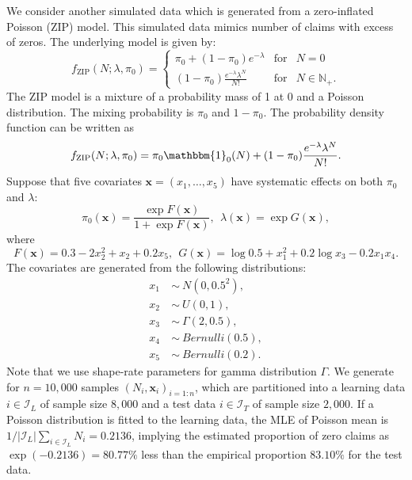 \documentclass[11pt]{article}
\numberwithin{equation}{section}
\def\N{{\mathbb N}}  %
\def\bx{\boldsymbol{x}}
\begin{document}
We consider another simulated data which is generated from a zero-inflated Poisson (ZIP) model. This simulated data mimics number of claims with excess of zeros.
The underlying  model is given by:
\begin{equation}
	f_{\text{ZIP}}(N;\lambda,\pi_0) = \left\{ 
	\begin{array}{ccl}
		\pi_0+(1-\pi_0)e^{-\lambda} & \mbox{for}
		& N=0 \\
		(1-\pi_0)\frac{e^{-\lambda}\lambda^N}{N!} & \mbox{for} &N\in\N_+.
	\end{array}\right.
\end{equation}
The ZIP model is a mixture of a probability mass of 1 at 0 and a Poisson distribution. The mixing probability is $\pi_0$ and $1-\pi_0$.
The probability density function can be written as
$$f_\text{ZIP}(N;\lambda,\pi_0)= \pi_0\mathbbm{1}_{0}(N) + 
(1-\pi_0)\frac{e^{-\lambda}\lambda^N}{N!}.$$
Suppose that five covariates $\bx=(x_1,\ldots,x_5)$ have systematic effects on both $\pi_0$ and $\lambda$:
\begin{equation}
	\pi_0(\bx)=\frac{\exp F(\bx)}{1+\exp F(\bx)}, ~~
	\lambda(\bx)=\exp G(\bx), 
\end{equation}
where
\begin{equation}
	F(\bx)=0.3-2x_2^2+x_2+0.2x_5, ~~G(\bx)=\log 0.5+x_1^2 + 0.2\log x_3 - 0.2x_1 x_4.
\end{equation}
The covariates are generated from the following distributions:
\begin{align*}
	x_1~&\sim~N(0,0.5^2),\\
	x_2~&\sim~U(0,1), \\
	x_3~&\sim~\Gamma(2,0.5), \\
	x_4~&\sim~Bernulli(0.5),\\
	x_5~&\sim~Bernulli(0.2).
\end{align*}
Note that we use shape-rate parameters for gamma distribution $\Gamma$.
We generate for $n=10,000$ samples $(N_i,\bx_i)_{i=1:n}$, which are partitioned into a learning data $i\in\mathcal{I}_{L}$ of sample size $8,000$ and a test data $i\in\mathcal{I}_{T}$ of sample size $2,000$. 
If a Poisson distribution is fitted to the learning data, the MLE of Poisson mean is $1/|\mathcal{I}_L|\sum_{i\in\mathcal{I}_L}N_i=0.2136$, implying the estimated proportion of zero claims as $\exp(-0.2136)=80.77\%$ less than the empirical proportion $83.10\%$ for the test data. 
\end{document}
